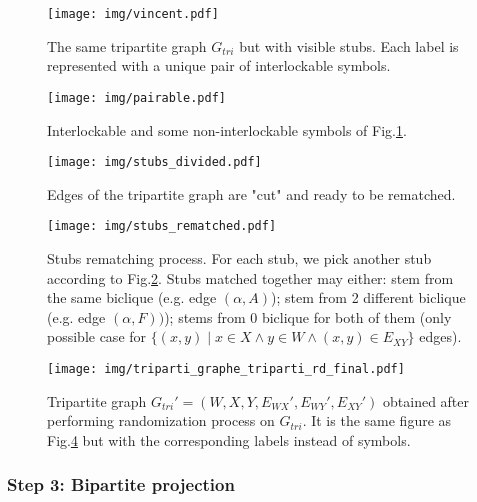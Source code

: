 \documentclass[table]{report}
\begin{document}
\begin{figure}[h]%
\centering
\texttt{[image: img/vincent.pdf]}
\caption{The same tripartite graph $G_{tri}$ but with visible stubs. Each label is represented with a unique pair of interlockable symbols.}
\label{fig:vincent}
\end{figure}
\FloatBarrier

\begin{figure}[h]%
\centering
\texttt{[image: img/pairable.pdf]}
\caption{Interlockable and some non-interlockable symbols of Fig.\ref{fig:vincent}. }
\label{fig:pairable}
\end{figure}
\FloatBarrier

\begin{figure}[h]%
\centering
\texttt{[image: img/stubs\_divided.pdf]}
\caption{Edges of the tripartite graph are "cut" and ready to be rematched.}
\label{fig:graphs}
\end{figure}
\FloatBarrier



\begin{figure}[h]%
\centering
\texttt{[image: img/stubs\_rematched.pdf]}
\caption{Stubs rematching process. For each stub, we pick another stub according to Fig.\ref{fig:pairable}. Stubs matched together may either: stem from the same biclique (e.g. edge $(\alpha,A)$); stem from 2 different biclique (e.g. edge $(\alpha,F))$); stems from 0 biclique for both of them (only possible case for $\{(x,y) \mid x \in X \wedge y \in W \wedge (x,y) \in E_{XY}\}$ edges). }
\label{fig:stubs_rematched}
\end{figure}
\FloatBarrier


\begin{figure}[h]%
\centering
\texttt{[image: img/triparti\_graphe\_triparti\_rd\_final.pdf]}
\caption{Tripartite graph ${G_{tri}}'=(W,X,Y,{E_{WX}}',{E_{WY}}',{E_{XY}}')$ obtained after performing randomization process on $G_{tri}$. It is the same figure as Fig.\ref{fig:stubs_rematched} but with the corresponding labels instead of symbols.}
\label{fig:graphs}
\end{figure}
\FloatBarrier

\subsubsection{Step 3: Bipartite projection}
\end{document}
